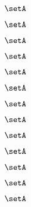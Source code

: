 \begin{forslides}
\begin{forslides}
    \begin{equation}
        \label{eq:slides-translation-73}
        \setA
    \end{equation}

    \begin{equation}
        \label{eq:slides-translation-74}
        \setA
    \end{equation}

    \begin{equation}
        \label{eq:slides-translation-75}
        \setA
    \end{equation}

    \begin{equation}
        \label{eq:slides-translation-76}
        \setA
    \end{equation}

    \begin{equation}
        \label{eq:slides-translation-77}
        \setA
    \end{equation}

    \begin{equation}
        \label{eq:slides-translation-78}
        \setA
    \end{equation}

    \begin{equation}
        \label{eq:slides-translation-79}
        \setA
    \end{equation}

    \begin{equation}
        \label{eq:slides-translation-80}
        \setA
    \end{equation}

    \begin{equation}
        \label{eq:slides-translation-81}
        \setA
    \end{equation}

    \begin{equation}
        \label{eq:slides-translation-82}
        \setA
    \end{equation}

    \begin{equation}
        \label{eq:slides-translation-83}
        \setA
    \end{equation}

    \begin{equation}
        \label{eq:slides-translation-84}
        \setA
    \end{equation}

    \begin{equation}
        \label{eq:slides-translation-85}
        \setA
    \end{equation}


\end{forslides}
\end{forslides}
